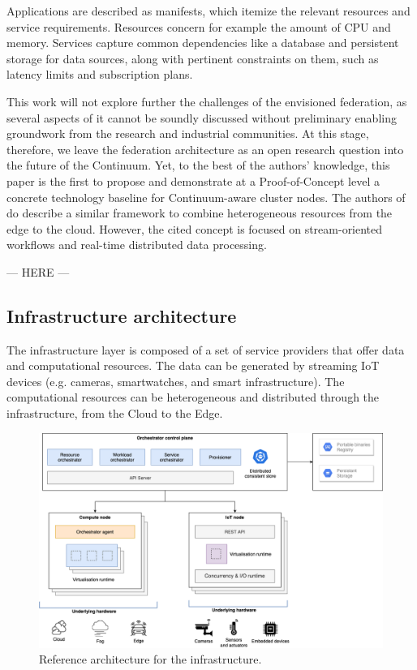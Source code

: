 Applications are described as manifests, which itemize the relevant resources and service requirements.
Resources concern for example the amount of CPU and memory. 
Services capture common dependencies like a database and persistent storage for data sources, along with pertinent constraints on them, such as latency limits and subscription plans.

This work will not explore further the challenges of the envisioned federation, as several aspects of it cannot be soundly discussed without preliminary enabling groundwork from the research and industrial communities. 
At this stage, therefore, we leave the federation architecture as an open research question into the future of the Continuum.
Yet, to the best of the authors' knowledge, this paper is the first to propose and demonstrate at a Proof-of-Concept level a concrete technology baseline for Continuum-aware cluster nodes. 
The authors of \cite{balouek2019towards} do describe a similar framework to combine heterogeneous resources from the edge to the cloud. However, the cited concept is focused on stream-oriented workflows and real-time distributed data processing.

--- HERE ---

\subsection{Infrastructure architecture}

The infrastructure layer is composed of a set of service providers that offer data and computational resources. The data can be generated by streaming IoT devices (e.g. cameras, smartwatches, and smart infrastructure). 
The computational resources can be heterogeneous and distributed through the infrastructure, from the Cloud to the Edge.

\begin{figure}[ht]
\centering
\includegraphics[width=\columnwidth]{figures/architecture-broad}
\caption{Reference architecture for the infrastructure.}
\label{fig:architecture-broad}
\end{figure}

